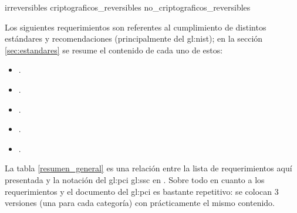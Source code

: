 {irreversibles}
{criptograficos_reversibles}
{no_criptograficos_reversibles}


Los siguientes requerimientos son referentes al cumplimiento
de distintos estándares y recomendaciones (principalmente del \gls{gl:nist});
en la sección \ref{sec:estandares} se resume el contenido de cada uno de
estos:

\begin{itemize}
  \item {}.
  \item {}.
  \item {}.
  \item {}.
  \item {}.
\end{itemize}

La tabla \ref{resumen_general} es una relación entre la lista de
requerimientos aquí presentada y la notación del \gls{gl:pci} \gls{gl:ssc} en
\cite{pci_tokens}. Sobre todo en cuanto a los requerimientos
 y
 el documento del \gls{gl:pci} es
bastante repetitivo: se colocan 3 versiones (una para cada categoría) con
prácticamente el mismo contenido.

